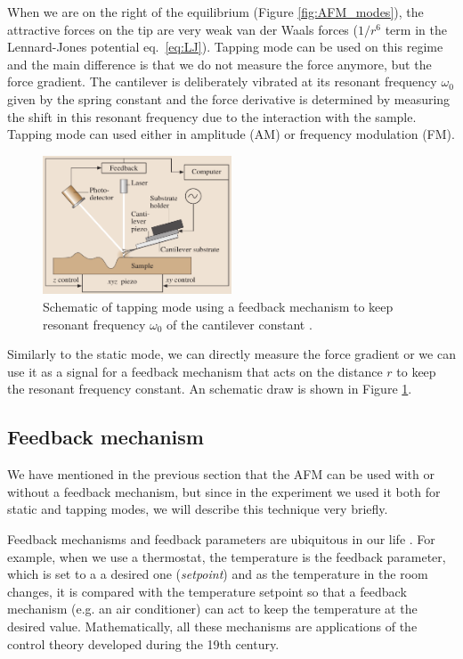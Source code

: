 \documentclass[11pt,a4paper]{article}
\begin{document}
When we are on the right of the equilibrium (Figure \ref{fig:AFM_modes}), the attractive forces on the tip are very weak van der Waals forces ($1/r^6$ term in the Lennard-Jones potential eq.~\eqref{eq:LJ}). Tapping mode can be used on this regime and the main difference is that we do not measure the force anymore, but the force gradient. The cantilever is deliberately vibrated at its resonant frequency $\omega_0$ given by the spring constant and the force derivative is determined by measuring the shift in this resonant frequency due to the interaction with the sample. Tapping mode can used either in amplitude (AM) or frequency modulation (FM).

\begin{figure}[ht]
\centering
\includegraphics[width=0.5\textwidth]{Tapping_mode}
\caption{Schematic of tapping mode using a feedback mechanism to keep resonant frequency $\omega_0$ of the cantilever constant \cite{Bhushan}.}
\label{fig:measurement_tapping}
\end{figure}

Similarly to the static mode, we can directly measure the force gradient or we can use it as a signal for a feedback mechanism that acts on the distance $r$ to keep the resonant frequency constant. An schematic draw is shown in Figure \ref{fig:measurement_tapping}.

\subsection{Feedback mechanism}\label{sec:feedback}
We have mentioned in the previous section that the AFM can be used with or without a feedback mechanism, but since in the experiment we used it both for static and tapping modes, we will describe this technique very briefly.

Feedback mechanisms and feedback parameters are ubiquitous in our life \cite{nanosurf}. For example, when we use a thermostat, the temperature is the feedback parameter, which is set to a a desired one (\emph{setpoint}) and as the temperature in the room changes, it is compared with the temperature setpoint so that a feedback mechanism (e.g. an air conditioner) can act to keep the temperature at the desired value. Mathematically, all these mechanisms are applications of the control theory developed during the 19th century.
\end{document}
